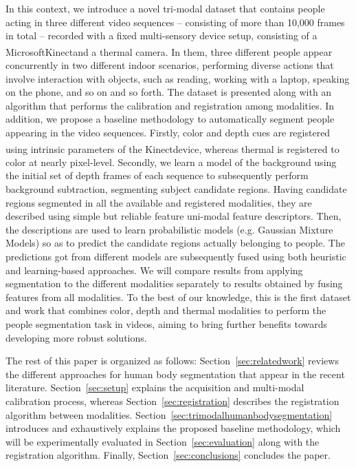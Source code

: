 \documentclass[10pt,twocolumn,letterpaper]{article}
\begin{document}
In this context, we introduce a novel tri-modal dataset that contains people acting in three different video sequences -- consisting of more than 10,000 frames in total -- recorded with a fixed multi-sensory device setup, consisting of a Microsoft\textsuperscript\textregistered Kinect\textsuperscript\texttrademark and a thermal camera. In them, three different people appear concurrently in two different indoor scenarios, performing diverse actions that involve interaction with objects, such as reading, working with a laptop, speaking on the phone, and so on and so forth. The dataset is presented along with an algorithm that performs the calibration and registration among modalities. In addition, we propose a baseline methodology to automatically segment people appearing in the video sequences. Firstly, color and depth cues are registered using intrinsic parameters of the Kinect\textsuperscript\texttrademark device, whereas thermal is registered to color at nearly pixel-level. Secondly, we learn a model of the background using the initial set of depth frames of each sequence to subsequently perform background subtraction, segmenting subject candidate regions. Having candidate regions segmented in all the available and registered modalities, they are described using simple but reliable feature uni-modal feature descriptors. Then, the descriptions are used to learn probabilistic models (e.g. Gaussian Mixture Models) so as to predict the candidate regions actually belonging to people. The predictions got from different models are subsequently fused using both heuristic and learning-based approaches. We will compare results from applying segmentation to the different modalities separately to results obtained by fusing features from all modalities. To the best of our knowledge, this is the first dataset and work that combines color, depth and thermal modalities to perform the people segmentation task in videos, aiming to bring further benefits towards developing more robust solutions.

The rest of this paper is organized as follows: Section~\ref{sec:relatedwork} reviews the different approaches for human body segmentation that appear in the recent literature. Section~\ref{sec:setup} explains the acquisition and multi-modal calibration process, whereas Section~\ref{sec:registration} describes the registration algorithm between modalities. Section~\ref{sec:trimodalhumanbodysegmentation} introduces and exhaustively explains the proposed baseline methodology, which will be experimentally evaluated in Section~\ref{sec:evaluation} along with the registration algorithm. Finally, Section~\ref{sec:conclusions} concludes the paper.
\end{document}
